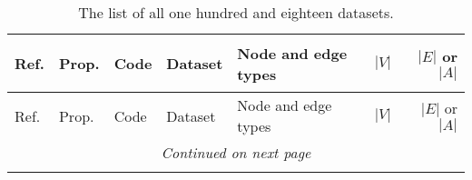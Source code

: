 
\begin{longtable}{ l l l l l r r }

\caption[The list of all one hundred and eighteen datasets]{The list of all one hundred and eighteen datasets.}  \\


\label{tab:datasets}

Ref. & Prop. & Code & Dataset & Node and edge types & $|V|$ & $|E|$ or $|A|$ \\ 
\hline

\endfirsthead


\hline
Ref. & Prop. & Code & Dataset & Node and edge types & $|V|$ & $|E|$ or $|A|$ \\ 
\hline

\endhead

\hline
\multicolumn{7}{c}{\textit{Continued on next page}} \\* 
\hline

\endfoot

\hline \hline
\endlastfoot


\end{longtable}
